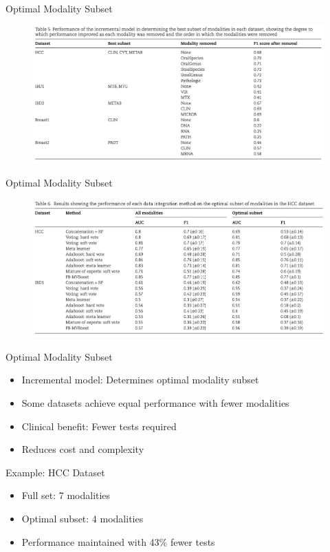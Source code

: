 \documentclass{beamer}
\begin{document}
\begin{frame}{Optimal Modality Subset}
  \begin{figure}[H]
    \centering
    \includegraphics[width=1\textwidth]{assets/perform_sub.png}
  \end{figure}
\end{frame}

\begin{frame}{Optimal Modality Subset}
  \begin{figure}[H]
    \centering
    \includegraphics[width=1\textwidth]{assets/perform_data_inte.png}
  \end{figure}
\end{frame}

\begin{frame}{Optimal Modality Subset}
\begin{itemize}
\item \alert{Incremental model}: Determines optimal modality subset
\item Some datasets achieve \alert{equal performance} with fewer modalities
\item \alert{Clinical benefit}: Fewer tests required
\item Reduces cost and complexity
\end{itemize}

\begin{block}{Example: HCC Dataset}
\begin{itemize}
\item Full set: 7 modalities
\item Optimal subset: 4 modalities
\item Performance maintained with 43\% fewer tests
\end{itemize}
\end{block}
\end{frame}
\end{document}
